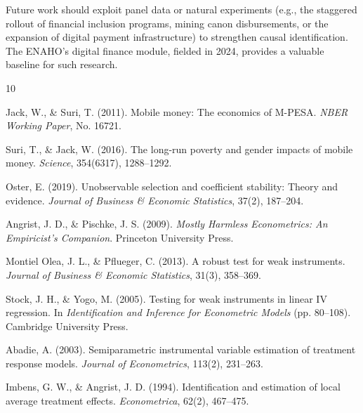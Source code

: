 \documentclass[12pt,a4paper]{article}
\begin{document}
Future work should exploit panel data or natural experiments (e.g., the
staggered rollout of financial inclusion programs, mining canon disbursements,
or the expansion of digital payment infrastructure) to strengthen causal
identification. The ENAHO's digital finance module, fielded in 2024, provides
a valuable baseline for such research.


\begin{thebibliography}{10}

Jack, W., \& Suri, T. (2011).
Mobile money: The economics of M-PESA.
\textit{NBER Working Paper}, No. 16721.

Suri, T., \& Jack, W. (2016).
The long-run poverty and gender impacts of mobile money.
\textit{Science}, 354(6317), 1288--1292.

Oster, E. (2019).
Unobservable selection and coefficient stability: Theory and evidence.
\textit{Journal of Business \& Economic Statistics}, 37(2), 187--204.

Angrist, J. D., \& Pischke, J. S. (2009).
\textit{Mostly Harmless Econometrics: An Empiricist's Companion}.
Princeton University Press.

Montiel Olea, J. L., \& Pflueger, C. (2013).
A robust test for weak instruments.
\textit{Journal of Business \& Economic Statistics}, 31(3), 358--369.

Stock, J. H., \& Yogo, M. (2005).
Testing for weak instruments in linear IV regression.
In \textit{Identification and Inference for Econometric Models} (pp. 80--108).
Cambridge University Press.

Abadie, A. (2003).
Semiparametric instrumental variable estimation of treatment response models.
\textit{Journal of Econometrics}, 113(2), 231--263.

Imbens, G. W., \& Angrist, J. D. (1994).
Identification and estimation of local average treatment effects.
\textit{Econometrica}, 62(2), 467--475.

\end{thebibliography}



\end{document}
